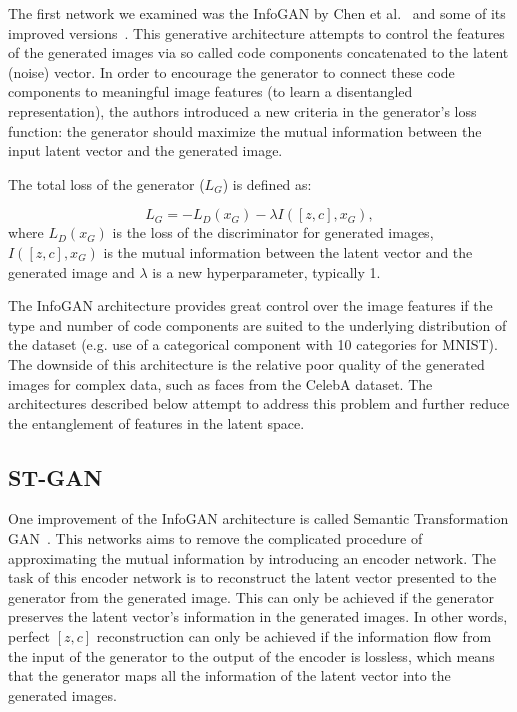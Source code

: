\documentclass{egpubl}
\begin{document}
The first network we examined was the InfoGAN by Chen et al.~\cite{chen2016infogan} and some of its improved versions~\cite{10.1007/978-3-319-78452-6_5,mirza2014conditional}. This generative architecture attempts to control the features of the generated images via so called code components concatenated to the latent (noise) vector. In order to encourage the generator to connect these code components to meaningful image features (to learn a disentangled representation), the authors introduced a new criteria in the generator's loss function: the generator should maximize the mutual information between the input latent vector and the generated image.

The total loss of the generator ($L_G$) is defined as:

\begin{equation}\label{g_loss}
L_G = -L_D(x_G) - \lambda I([z,c], x_G),
\end{equation}
where $L_D(x_G)$ is the loss of the discriminator for generated images, $I([z,c], x_G)$ is the mutual information between the latent vector and the generated image and $\lambda$ is a new hyperparameter, typically 1.

The InfoGAN architecture provides great control over the image features if the type and number of code components are suited to the underlying distribution of the dataset (e.g. use of a categorical component with 10 categories for MNIST). The downside of this architecture is the relative poor quality of the generated images for complex data, such as faces from the CelebA dataset. The architectures described below attempt to address this problem and further reduce the entanglement of features in the latent space.


\subsection{ST-GAN}
\label{sec:propDet}

One improvement of the InfoGAN architecture is called Semantic Transformation GAN~\cite{liu2019stgan}. This networks aims to remove the complicated procedure of approximating the mutual information by introducing an encoder network. The task of this encoder network is to reconstruct the latent vector presented to the generator from the generated image. This can only be achieved if the generator preserves the latent vector's information in the generated images. In other words, perfect $[z,c]$ reconstruction can only be achieved if the information flow from the input of the generator to the output of the encoder is lossless, which means that the generator maps all the information of the latent vector into the generated images.
\end{document}

